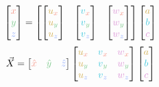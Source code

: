 \documentclass[preview]{standalone}
\begin{document}
$$\begin{bmatrix}\textcolor[HTML]{f59789}{x}\\\textcolor[HTML]{7dc98c}{y}\\\textcolor[HTML]{96b1fe}{z}\end{bmatrix} = \begin{bmatrix}
\begin{bmatrix}\textcolor[HTML]{d2b057}{u}_{\textcolor[HTML]{f59789}{x}}\\\textcolor[HTML]{d2b057}{u}_{\textcolor[HTML]{7dc98c}{y}}\\\textcolor[HTML]{d2b057}{u}_{\textcolor[HTML]{96b1fe}{z}}\end{bmatrix} &
\begin{bmatrix}\textcolor[HTML]{43c8dc}{v}_{\textcolor[HTML]{f59789}{x}}\\\textcolor[HTML]{43c8dc}{v}_{\textcolor[HTML]{7dc98c}{y}}\\\textcolor[HTML]{43c8dc}{v}_{\textcolor[HTML]{96b1fe}{z}}\end{bmatrix} &
\begin{bmatrix}\textcolor[HTML]{dd99d8}{w}_{\textcolor[HTML]{f59789}{x}}\\\textcolor[HTML]{dd99d8}{w}_{\textcolor[HTML]{7dc98c}{y}}\\\textcolor[HTML]{dd99d8}{w}_{\textcolor[HTML]{96b1fe}{z}}\end{bmatrix}
\end{bmatrix}\begin{bmatrix}\textcolor[HTML]{d2b057}{a}\\\textcolor[HTML]{43c8dc}{b}\\\textcolor[HTML]{dd99d8}{c}\end{bmatrix}$$
$$\vec{X} = \begin{bmatrix}\textcolor[HTML]{f59789}{\hat{x}}&\textcolor[HTML]{7dc98c}{\hat{y}}&\textcolor[HTML]{96b1fe}{\hat{z}}\end{bmatrix}\begin{bmatrix}
\textcolor[HTML]{d2b057}{u}_{\textcolor[HTML]{f59789}{x}}&\textcolor[HTML]{43c8dc}{v}_{\textcolor[HTML]{f59789}{x}}&\textcolor[HTML]{dd99d8}{w}_{\textcolor[HTML]{f59789}{x}}\\
\textcolor[HTML]{d2b057}{u}_{\textcolor[HTML]{7dc98c}{y}}&\textcolor[HTML]{43c8dc}{v}_{\textcolor[HTML]{7dc98c}{y}}&\textcolor[HTML]{dd99d8}{w}_{\textcolor[HTML]{7dc98c}{y}}\\
\textcolor[HTML]{d2b057}{u}_{\textcolor[HTML]{96b1fe}{z}}&\textcolor[HTML]{43c8dc}{v}_{\textcolor[HTML]{96b1fe}{z}}&\textcolor[HTML]{dd99d8}{w}_{\textcolor[HTML]{96b1fe}{z}}
\end{bmatrix}\begin{bmatrix}\textcolor[HTML]{d2b057}{a}\\\textcolor[HTML]{43c8dc}{b}\\\textcolor[HTML]{dd99d8}{c}\end{bmatrix}$$
\end{document}
